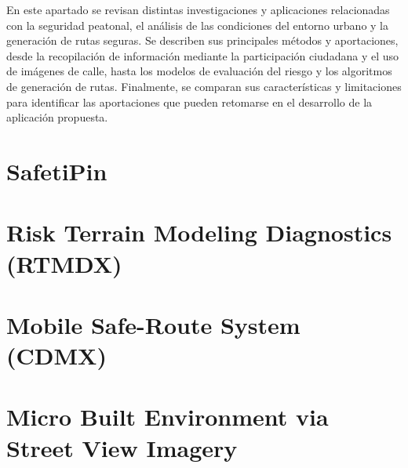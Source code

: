 En este apartado se revisan distintas investigaciones y aplicaciones relacionadas con la seguridad peatonal, el análisis de las condiciones del entorno urbano y la generación de rutas seguras. Se describen sus principales métodos y aportaciones, desde la recopilación de información mediante la participación ciudadana y el uso de imágenes de calle, hasta los modelos de evaluación del riesgo y los algoritmos de generación de rutas. Finalmente, se comparan sus características y limitaciones para identificar las aportaciones que pueden retomarse en el desarrollo de la aplicación propuesta.

\section{SafetiPin}
\label{sec:safetipin}


\section{Risk Terrain Modeling Diagnostics (RTMDX)}
\label{sec:rtmdx}


\section{Mobile Safe-Route System (CDMX)}
\label{sec:mobile_safe_route}


\section{Micro Built Environment via Street View Imagery}
\label{sec:micro_built_environment}


